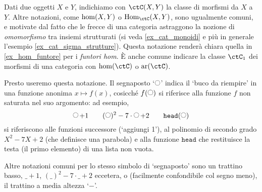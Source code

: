 \begin{notation}
	Dati due oggetti \(X\) e \(Y\), indichiamo con \(\Hom{\ctC}(X,Y)\) la classe di morfismi da \(X\) a \(Y\). Altre notazioni, come \(\hom(X,Y)\) o \(\vvarHom{\ctC}(X,Y)\), sono ugualmente comuni, e motivate dal fatto che le frecce di una categoria astraggono la nozione di \emph{omomorfismo} tra insiemi strutturati (si veda \ref{ex_cat_monoidi} e più in generale l'esempio \ref{ex_cat_sigma_strutture}). Questa notazione renderà chiara quella in \ref{ex_hom_funtore} per i \emph{funtori hom}. \`E anche comune indicare la classe \(\ctC_1\) dei morfismi di una categoria con \(\hom(\ctC)\) o \(\mathrm{ar}(\ctC)\).
\end{notation}
\begin{notation}
	Presto useremo questa notazione. Il segnaposto `\(\blank\)' indica il `buco da riempire' in una funzione anonima \(x\mapsto f(x)\), cosicché \(f(\blank)\) si riferisce alla funzione \(f\) non saturata nel suo argomento: ad esempio,
	\[\blank+1 \qquad (\blank)^2 -7\cdot\blank + 2 \qquad \texttt{head}(\blank)\]
	si riferiscono alle funzioni successore (`aggiungi 1'), al polinomio di secondo grado \(X^2-7X+2\) (che definisce una parabola) e alla funzione \(\texttt{head}\) che restituisce la testa (il primo elemento) di una lista non vuota.

	Altre notazioni comuni per lo stesso simbolo di `segnaposto' sono un trattino basso, \(\_+1\), \((\_)^2 -7\cdot\_ + 2\) eccetera, o (facilmente confondibile col segno meno), il trattino a media altezza `\(-\)'.
\end{notation}
